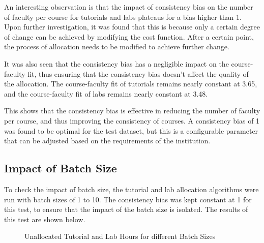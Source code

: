 An interesting observation is that the impact of consistency bias on the number of faculty per course for tutorials and labs plateaus for a bias higher than 1. Upon further investigation, it was found that this is because only a certain degree of change can be achieved by modifying the cost function. After a certain point, the process of allocation needs to be modified to achieve further change.

It was also seen that the consistency bias has a negligible impact on the course-faculty fit, thus ensuring that the consistency bias doesn't affect the quality of the allocation. The course-faculty fit of tutorials remains nearly constant at 3.65, and the course-faculty fit of labs remains nearly constant at 3.48.

This shows that the consistency bias is effective in reducing the number of faculty per course, and thus improving the consistency of courses. A consistency bias of 1 was found to be optimal for the test dataset, but this is a configurable parameter that can be adjusted based on the requirements of the institution.

\subsection{Impact of Batch Size}

To check the impact of batch size, the tutorial and lab allocation algorithms were run with batch sizes of 1 to 10. The consistency bias was kept constant at 1 for this test, to ensure that the impact of the batch size is isolated. The results of this test are shown below.

\begin{figure}[H]
  \centering
  \caption{Unallocated Tutorial and Lab Hours for different Batch Sizes}
  \label{fig:unallocated_batch_size}
\end{figure}

